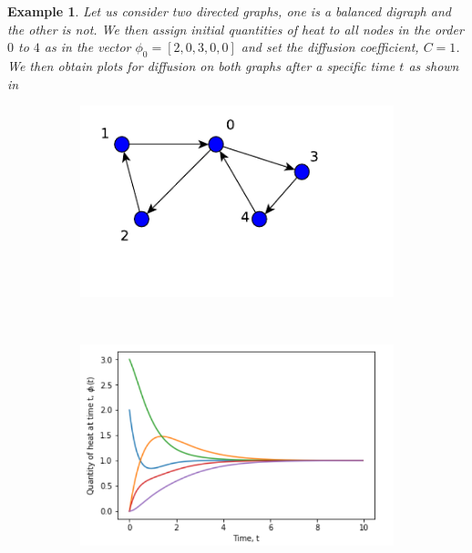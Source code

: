 \documentclass[10pt,a4paper]{article}
\newtheorem{exa}{Example}
\begin{document}
      \begin{exa}
      	Let us consider two directed graphs, one is a balanced digraph and the other is not. We then assign initial quantities of heat to all nodes in the order $0$ to $4$ as in the vector $\phi_0=[2,0,3,0,0]$ and set the diffusion coefficient, $C=1$. We then obtain plots for diffusion on both graphs after a specific time $t$ as shown in 
      	
      	\begin{figure}[H]
      		\centering
      	    \begin{subfigure}[b]{0.40\textwidth}
      	    	\includegraphics[width=\textwidth]{images/balanceDigraph.pdf}
      	    	\caption{}
      	    	\label{balanced-graph}
      	    \end{subfigure}~
      	    \begin{subfigure}[b]{0.5\textwidth}
      	    	\includegraphics[width= \textwidth]{images/Balanced-digraph-diffusion.png}
      	    	\caption{}
      	    	\label{plot-balanced}

\end{subfigure}
\end{figure}
\end{exa}
\end{document}
